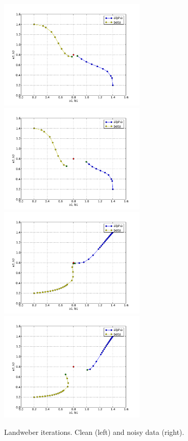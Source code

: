 \begin{figure}
\begin{center}
    \includegraphics[width=7cm]{chapters/schroll/pdf/4D-1scan3.pdf}
    \includegraphics[width=7cm]{chapters/schroll/pdf/4D-1scan3-5.pdf}
    \includegraphics[width=7cm]{chapters/schroll/pdf/4D-1scan4.pdf}
    \includegraphics[width=7cm]{chapters/schroll/pdf/4D-1scan4-5.pdf}
    \end{center}
    \vspace{-0.7cm}
  \caption{Landweber iterations. Clean (left) and noisy data (right). \label{fig5}}
\end{figure}

